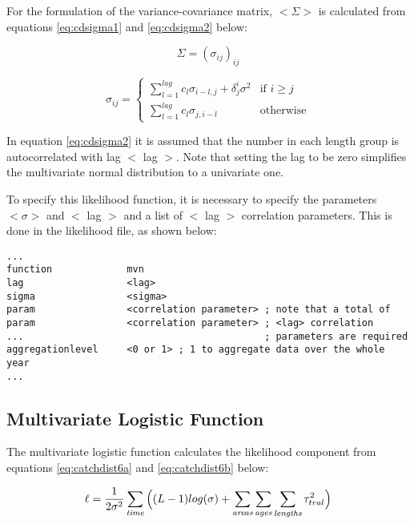 \documentclass[10pt,twoside]{book}
\begin{document}
\bigskip
For the formulation of the variance-covariance matrix, $<\Sigma>$ is calculated from equations \ref{eq:cdsigma1} and \ref{eq:cdsigma2} below:

\begin{equation}\label{eq:cdsigma1}
\Sigma = (\sigma_{ij})_{ij}
\end{equation}

\begin{equation}\label{eq:cdsigma2}
\sigma_{ij} =
\begin{cases}
\displaystyle \sum^{lag}_{l=1} c_l \sigma_{i-l,j} + \delta^i_{j} \sigma^2 & \textrm{if $i \geq j$} \\
\displaystyle \sum^{lag}_{l=1} c_l \sigma_{j,i-l} & \textrm{otherwise}
\end{cases}
\end{equation}

In equation \ref{eq:cdsigma2} it is assumed that the number in each length group is autocorrelated with lag $<$ lag $>$.  Note that setting the lag to be zero simplifies the multivariate normal distribution to a univariate one.

\bigskip
To specify this likelihood function, it is necessary to specify the parameters $<\sigma>$ and $<$ lag $>$ and a list of $<$ lag $>$ correlation parameters.  This is done in the likelihood file, as shown below:

{\small\begin{verbatim}
...
function             mvn
lag                  <lag>
sigma                <sigma>
param                <correlation parameter> ; note that a total of
param                <correlation parameter> ; <lag> correlation
...                                          ; parameters are required
aggregationlevel     <0 or 1> ; 1 to aggregate data over the whole year
...
\end{verbatim}}

\subsection{Multivariate Logistic Function}
The multivariate logistic function calculates the likelihood component from equations \ref{eq:catchdist6a} and \ref{eq:catchdist6b} below:

\begin{equation}\label{eq:catchdist6a}
\ell = \frac{1}{2\sigma^2} \sum_{\it time} \Big((L - 1) log(\sigma)+\sum_{\it areas}\sum_{\it ages}\sum_{\it lengths} \tau_{tral}^2 \Big)
\end{equation}
\end{document}
